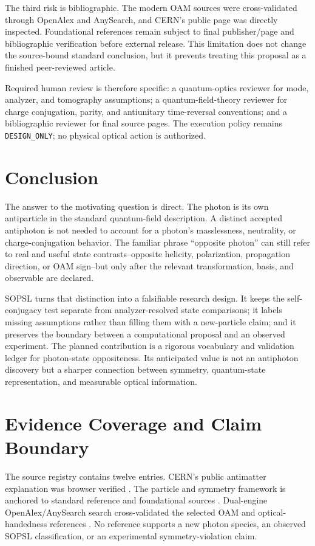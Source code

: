 \documentclass[conference]{../../../../Conference-LaTeX-template_10-17-19/IEEEtran}
\begin{document}
The third risk is bibliographic. The modern OAM sources were cross-validated through OpenAlex and AnySearch, and CERN’s public page was directly inspected. Foundational references remain subject to final publisher/page and bibliographic verification before external release. This limitation does not change the source-bound standard conclusion, but it prevents treating this proposal as a finished peer-reviewed article.

Required human review is therefore specific: a quantum-optics reviewer for mode, analyzer, and tomography assumptions; a quantum-field-theory reviewer for charge conjugation, parity, and antiunitary time-reversal conventions; and a bibliographic reviewer for final source pages. The execution policy remains \texttt{DESIGN\_ONLY}; no physical optical action is authorized.

\section{Conclusion}
The answer to the motivating question is direct. The photon is its own antiparticle in the standard quantum-field description. A distinct accepted antiphoton is not needed to account for a photon’s masslessness, neutrality, or charge-conjugation behavior. The familiar phrase “opposite photon” can still refer to real and useful state contrasts--opposite helicity, polarization, propagation direction, or OAM sign--but only after the relevant transformation, basis, and observable are declared.

SOPSL turns that distinction into a falsifiable research design. It keeps the self-conjugacy test separate from analyzer-resolved state comparisons; it labels missing assumptions rather than filling them with a new-particle claim; and it preserves the boundary between a computational proposal and an observed experiment. The planned contribution is a rigorous vocabulary and validation ledger for photon-state oppositeness. Its anticipated value is not an antiphoton discovery but a sharper connection between symmetry, quantum-state representation, and measurable optical information.

\appendices
\section{Evidence Coverage and Claim Boundary}
The source registry contains twelve entries. CERN’s public antimatter explanation was browser verified \cite{cern_antimatter_page}. The particle and symmetry framework is anchored to standard reference and foundational sources \cite{pdg2022,weinberg_qft1,wigner1939,jacob_wick1959,yang1950}. Dual-engine OpenAlex/AnySearch search cross-validated the selected OAM and optical-handedness references \cite{krenn2017,forbes_andrews2021,leach2009,erhard2017,gauthier2017}. No reference supports a new photon species, an observed SOPSL classification, or an experimental symmetry-violation claim.
\end{document}

